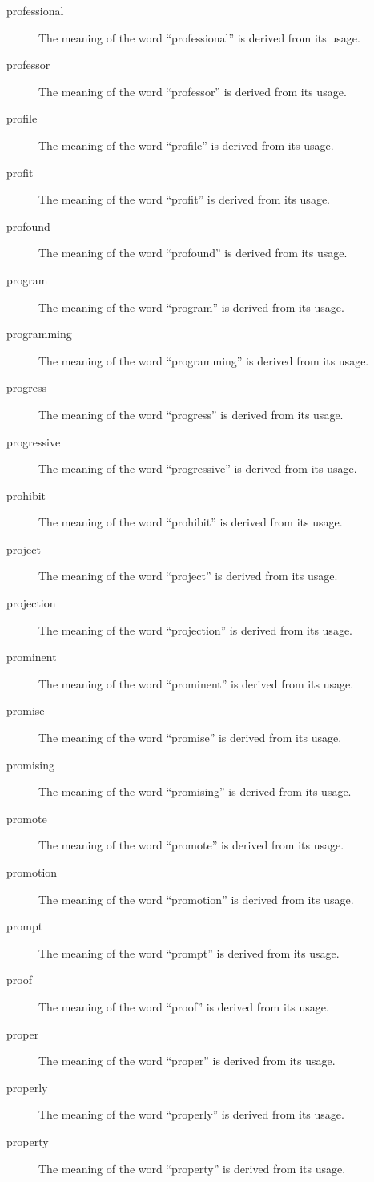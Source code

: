 \documentclass[12pt, letterpaper]{memoir}
\begin{document}
\begin{description}
\item[professional] The meaning of the word ``professional'' is derived from its usage.
\item[professor] The meaning of the word ``professor'' is derived from its usage.
\item[profile] The meaning of the word ``profile'' is derived from its usage.
\item[profit] The meaning of the word ``profit'' is derived from its usage.
\item[profound] The meaning of the word ``profound'' is derived from its usage.
\item[program] The meaning of the word ``program'' is derived from its usage.
\item[programming] The meaning of the word ``programming'' is derived from its usage.
\item[progress] The meaning of the word ``progress'' is derived from its usage.
\item[progressive] The meaning of the word ``progressive'' is derived from its usage.
\item[prohibit] The meaning of the word ``prohibit'' is derived from its usage.
\item[project] The meaning of the word ``project'' is derived from its usage.
\item[projection] The meaning of the word ``projection'' is derived from its usage.
\item[prominent] The meaning of the word ``prominent'' is derived from its usage.
\item[promise] The meaning of the word ``promise'' is derived from its usage.
\item[promising] The meaning of the word ``promising'' is derived from its usage.
\item[promote] The meaning of the word ``promote'' is derived from its usage.
\item[promotion] The meaning of the word ``promotion'' is derived from its usage.
\item[prompt] The meaning of the word ``prompt'' is derived from its usage.
\item[proof] The meaning of the word ``proof'' is derived from its usage.
\item[proper] The meaning of the word ``proper'' is derived from its usage.
\item[properly] The meaning of the word ``properly'' is derived from its usage.
\item[property] The meaning of the word ``property'' is derived from its usage.

\end{description}
\end{document}
